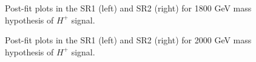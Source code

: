 \begin{figure}[H]
  \centering
  \caption{Post-fit plots in the SR1 (left) and SR2 (right) for 1800 GeV mass hypothesis of $H^{+}$ signal.}
  \label{fig:Postfit_Hp1000_Asimov}
\end{figure}
\begin{figure}[H]
  \centering
  \caption{Post-fit plots in the SR1 (left) and SR2 (right) for 2000 GeV mass hypothesis of $H^{+}$ signal.}
  \label{fig:Postfit_Hp1000_Asimov}
\end{figure}
